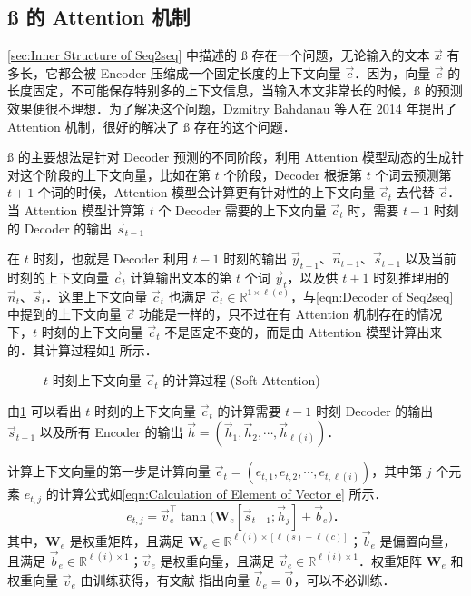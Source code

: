 \subsection{\ss{} 的 Attention 机制}
\cref{sec:Inner Structure of Seq2seq} 中描述的 \ss{} 存在一个问题，无论输入的文本 $\vec{x}$ 有多长，它都会被 Encoder 压缩成一个固定长度的上下文向量 $\vec{c}$．因为，向量 $\vec{c}$ 的长度固定，不可能保存特别多的上下文信息，当输入本文非常长的时候，\ss{} 的预测效果便很不理想．为了解决这个问题，Dzmitry Bahdanau 等人在 2014 年提出了 Attention 机制\cite{Bahdanau-2014-p-}，很好的解决了 \ss{} 存在的这个问题．

\ss{} 的主要想法是针对 Decoder 预测的不同阶段，利用 Attention 模型动态的生成针对这个阶段的上下文向量，比如在第 $t$ 个阶段，Decoder 根据第 $t$ 个词去预测第 $t+1$ 个词的时候，Attention 模型会计算更有针对性的上下文向量 $\vec{c}_t$ 去代替 $\vec{c}$．当 Attention 模型计算第 $t$ 个 Decoder 需要的上下文向量 $\vec{c}_t$ 时，需要 $t-1$ 时刻的 Decoder 的输出 $\vec{s}_{t-1}$

在 $t$ 时刻，也就是 Decoder 利用 $t-1$ 时刻的输出 $\vec{y}_{t-1}$、$\vec{n}_{t-1}$、$\vec{s}_{t-1}$ 以及当前时刻的上下文向量 $\vec{c}_t$ 计算输出文本的第 $t$ 个词 $\vec{y}_t$，以及供 $t+1$ 时刻推理用的 $\vec{n}_{t}$、$\vec{s}_{t}$．这里上下文向量 $\vec{c}_t$ 也满足 $\vec{c}_t\in\mathbb{R}^{1\times\ell(c)}$，与\cref{eqn:Decoder of Seq2seq} 中提到的上下文向量 $\vec{c}$ 功能是一样的，只不过在有 Attention 机制存在的情况下，$t$ 时刻的上下文向量 $\vec{c}_t$ 不是固定不变的，而是由 Attention 模型计算出来的．其计算过程如\cref{fig:Calculation of Context Vector at t Soft} 所示．%
%
\begin{figure}[!htb]
  \centering
  \scalebox{0.45}{}
  \caption{$t$ 时刻上下文向量 $\vec{c}_t$ 的计算过程 (Soft Attention)}
  \label{fig:Calculation of Context Vector at t Soft}
\end{figure}%
%
由\cref{fig:Calculation of Context Vector at t Soft} 可以看出 $t$ 时刻的上下文向量 $\vec{c}_t$ 的计算需要 $t-1$ 时刻 Decoder 的输出 $\vec{s}_{t-1}$ 以及所有 Encoder 的输出 $\vec{h} = (\vec{h}_1, \vec{h}_2, \cdots, \vec{h}_{\ell(i)})$．

计算上下文向量的第一步是计算向量 $\vec{e}_t = (e_{t, 1}, e_{t, 2}, \cdots, e_{t, \ell(i)})$，其中第 $j$ 个元素 $e_{t, j}$ 的计算公式如\cref{eqn:Calculation of Element of Vector e} 所示．%
%
\begin{equation}\label{eqn:Calculation of Element of Vector e}
  e_{t, j} = \vec{v}_e^\top\tanh\big(\bm{W}_e[\vec{s}_{t-1};\vec{h}_j] + \vec{b}_e\big)\text{．}
\end{equation}%
%
其中，$\bm{W}_e$ 是权重矩阵，且满足 $\bm{W}_e\in\mathbb{R}^{\ell(i)\times[\ell(s)+\ell(c)]}$；$\vec{b}_e$ 是偏置向量，且满足 $\vec{b}_e\in\mathbb{R}^{\ell(i)\times 1}$；$\vec{v}_e$ 是权重向量，且满足 $\vec{v}_e\in\mathbb{R}^{\ell(i)\times 1}$．权重矩阵 $\bm{W}_e$ 和权重向量 $\vec{v}_e$ 由训练获得，有文献 \cite{Luong-2015-p-} 指出向量 $\vec{b}_e = \vec{0}$，可以不必训练．

